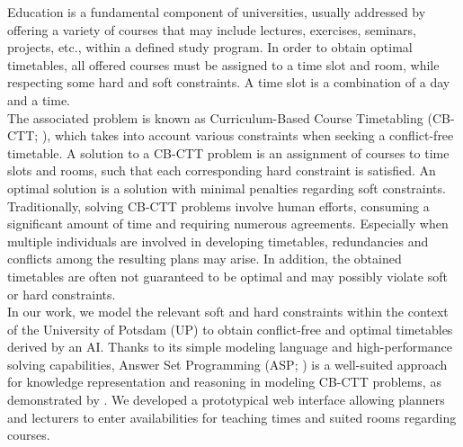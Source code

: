 \documentclass{easychair}
\newcommand{\CBCTT}{CB-CTT}
\newcommand{\UP}{UP}
\newcommand{\ASP}{ASP}
\begin{document}
  Education is a fundamental component of universities, usually addressed by offering a variety of courses that may include lectures, exercises, seminars, projects, etc., within a defined study program. 
  In order to obtain optimal timetables, all offered courses must be assigned to a time slot and room, while respecting some hard and soft constraints. 
  A time slot is a combination of a day and a time. \\
  The associated problem is known as Curriculum-Based Course Timetabling (\CBCTT{}; \cite{becaroto15}), which takes into account various constraints when seeking a conflict-free timetable. 
  A solution to a \CBCTT{} problem is an assignment of courses to time slots and rooms, such that each corresponding hard constraint is satisfied. 
  An optimal solution is a solution with minimal penalties regarding soft constraints. \\
  Traditionally, solving \CBCTT{} problems involve human efforts, consuming a significant amount of time and requiring numerous agreements.
  Especially when multiple individuals are involved in developing timetables, redundancies and conflicts among the resulting plans may arise.
  In addition, the obtained timetables are often not guaranteed to be optimal and may possibly violate soft or hard constraints. \\
  In our work, we model the relevant soft and hard constraints within the context of the University of Potsdam (\UP{}) to obtain conflict-free and optimal timetables derived by an AI. 
  Thanks to its simple modeling language and high-performance solving capabilities, Answer Set Programming (\ASP{}; \cite{baral02a}) is a well-suited approach for knowledge representation and reasoning in modeling \CBCTT{} problems, as demonstrated by \cite{bainkaokscsotawa18a}.
  We developed a prototypical web interface allowing planners and lecturers to enter availabilities for teaching times and suited rooms regarding courses. 
\end{document}

